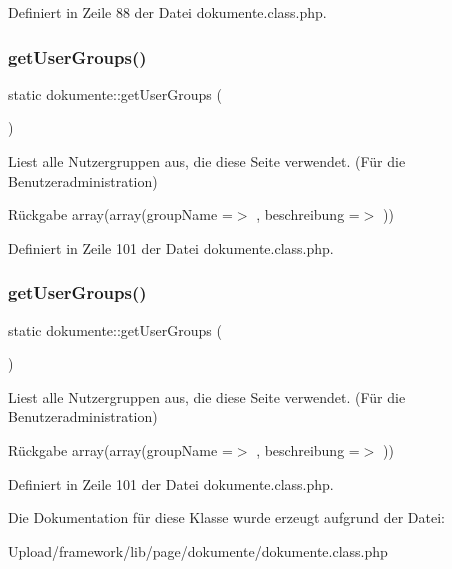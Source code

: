 Definiert in Zeile 88 der Datei dokumente.\+class.\+php.

\mbox{\label{classdokumente_a54e5fe41237e984537004709363d1e53}} 
\subsubsection{\texorpdfstring{get\+User\+Groups()}{getUserGroups()}\hspace{0.1cm}{\footnotesize\ttfamily [1/2]}}
{\footnotesize\ttfamily static dokumente\+::get\+User\+Groups (\begin{DoxyParamCaption}{ }\end{DoxyParamCaption})\hspace{0.3cm}{\ttfamily [static]}}

Liest alle Nutzergruppen aus, die diese Seite verwendet. (Für die Benutzeradministration) \begin{DoxyReturn}{Rückgabe}
array(array(\textquotesingle{}group\+Name\textquotesingle{} =$>$ \textquotesingle{}\textquotesingle{}, \textquotesingle{}beschreibung\textquotesingle{} =$>$ \textquotesingle{}\textquotesingle{})) 
\end{DoxyReturn}


Definiert in Zeile 101 der Datei dokumente.\+class.\+php.

\mbox{\label{classdokumente_a54e5fe41237e984537004709363d1e53}} 
\subsubsection{\texorpdfstring{get\+User\+Groups()}{getUserGroups()}\hspace{0.1cm}{\footnotesize\ttfamily [2/2]}}
{\footnotesize\ttfamily static dokumente\+::get\+User\+Groups (\begin{DoxyParamCaption}{ }\end{DoxyParamCaption})\hspace{0.3cm}{\ttfamily [static]}}

Liest alle Nutzergruppen aus, die diese Seite verwendet. (Für die Benutzeradministration) \begin{DoxyReturn}{Rückgabe}
array(array(\textquotesingle{}group\+Name\textquotesingle{} =$>$ \textquotesingle{}\textquotesingle{}, \textquotesingle{}beschreibung\textquotesingle{} =$>$ \textquotesingle{}\textquotesingle{})) 
\end{DoxyReturn}


Definiert in Zeile 101 der Datei dokumente.\+class.\+php.



Die Dokumentation für diese Klasse wurde erzeugt aufgrund der Datei\+:\begin{DoxyCompactItemize}
\item 
Upload/framework/lib/page/dokumente/dokumente.\+class.\+php\end{DoxyCompactItemize}
